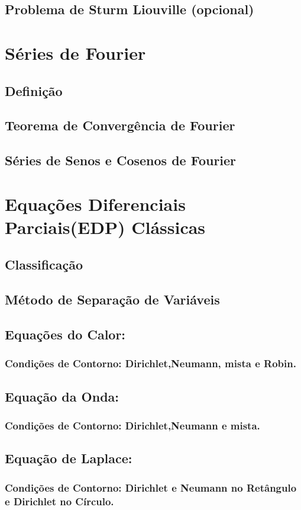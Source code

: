 \documentclass{article}
\begin{document}
\subsection{Problema de Sturm Liouville (opcional)}

\section{Séries de Fourier}
\subsection{Definição}
\subsection{Teorema de Convergência de Fourier}
\subsection{Séries de Senos e Cosenos de Fourier}

\section{Equações Diferenciais Parciais(EDP) Clássicas}
\subsection{Classificação}
\subsection{Método de Separação de Variáveis}
\subsection{Equações do Calor:}
\subsubsection{Condições de Contorno: Dirichlet,Neumann, mista e Robin.}
\subsection{Equação da Onda:}
\subsubsection{Condições de Contorno: Dirichlet,Neumann e mista.}
\subsection{Equação de Laplace:}
\subsubsection{Condições de Contorno: Dirichlet e Neumann no Retângulo e Dirichlet no Círculo.}
\end{document}
